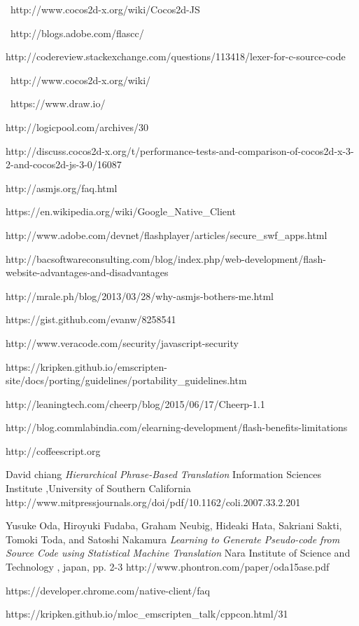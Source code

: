\documentclass[23pt]{article}
\begin{document}
\begin{thebibliography}{9}
\ http://www.cocos2d-x.org/wiki/Cocos2d-JS

\  http://blogs.adobe.com/flascc/

{http://codereview.stackexchange.com/questions/113418/lexer-for-c-source-code}

\  http://www.cocos2d-x.org/wiki/

\ https://www.draw.io/

{http://logicpool.com/archives/30}

{http://discuss.cocos2d-x.org/t/performance-tests-and-comparison-of-cocos2d-x-3-2-and-cocos2d-js-3-0/16087}

{http://asmjs.org/faq.html}

{https://en.wikipedia.org/wiki/Google\_Native\_Client}

{http://www.adobe.com/devnet/flashplayer/articles/secure\_swf\_apps.html}

{http://bacsoftwareconsulting.com/blog/index.php/web-development/flash-website-advantages-and-disadvantages}

{http://mrale.ph/blog/2013/03/28/why-asmjs-bothers-me.html}

{https://gist.github.com/evanw/8258541}

{http://www.veracode.com/security/javascript-security}

{https://kripken.github.io/emscripten-site/docs/porting/guidelines/portability\_guidelines.htm}

{http://leaningtech.com/cheerp/blog/2015/06/17/Cheerp-1.1}

{http://blog.commlabindia.com/elearning-development/flash-benefits-limitations}

{http://coffeescript.org}

David chiang
\textit{Hierarchical Phrase-Based Translation}
Information Sciences Institute ,University of Southern California
{http://www.mitpressjournals.org/doi/pdf/10.1162/coli.2007.33.2.201}

Yusuke Oda, Hiroyuki Fudaba, Graham Neubig, Hideaki Hata,
Sakriani Sakti, Tomoki Toda, and Satoshi Nakamura
\textit{Learning to Generate Pseudo-code from Source
Code using Statistical Machine Translation}
Nara Institute of Science and Technology , japan,  pp. 2-3
{http://www.phontron.com/paper/oda15ase.pdf}

{https://developer.chrome.com/native-client/faq}

{https://kripken.github.io/mloc\_emscripten\_talk/cppcon.html/31}

\end{thebibliography}
\end{document}
